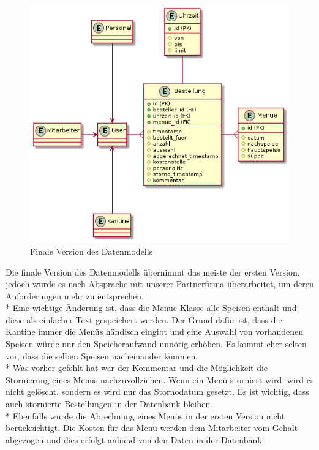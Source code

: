 \begin{figure}[htp]
    \centering
    \includegraphics[scale=0.5]{pics/erd-aktuell.png}
    \caption{Finale Version des Datenmodells}
    \label{fig:impl:ERDnew}
\end{figure}

Die finale Version des Datenmodells übernimmt das meiste der ersten Version, jedoch wurde es nach Absprache mit unserer Partnerfirma überarbeitet, um deren Anforderungen mehr zu entsprechen.\\*
Eine wichtige Änderung ist, dass die Menue-Klasse alle Speisen enthält und diese als einfacher Text gespeichert werden. Der Grund dafür ist, dass die Kantine
immer die Menüs händisch eingibt und eine Auswahl von vorhandenen Speisen würde nur den Speicheraufwand unnötig erhöhen. Es kommt eher selten vor, dass die selben Speisen nacheinander kommen.\\*
Was vorher gefehlt hat war der Kommentar und die Möglichkeit die Stornierung eines Menüs nachzuvollziehen. Wenn ein Menü storniert wird, wird es nicht gelöscht, sondern es wird nur 
das Stornodatum gesetzt. Es ist wichtig, dass auch stornierte Bestellungen in der Datenbank bleiben. \\*
Ebenfalls wurde die Abrechnung eines Menüs in der ersten Version nicht berücksichtigt. Die Kosten für das Menü werden dem Mitarbeiter vom Gehalt abgezogen und dies erfolgt anhand 
von den Daten in der Datenbank.


